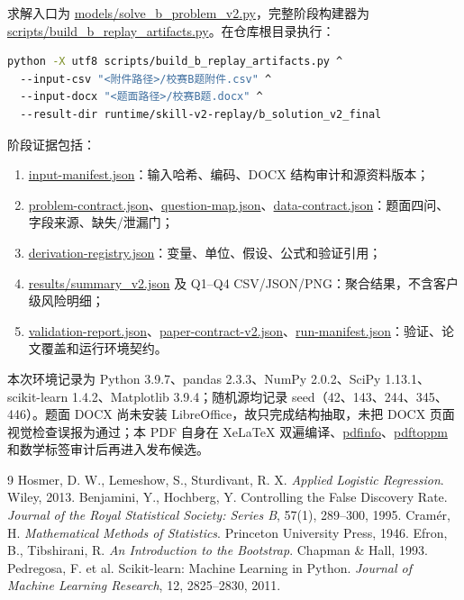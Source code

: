 \documentclass[UTF8,a4paper,11pt]{ctexart}
\newcommand{\code}[1]{\url{#1}}
\begin{document}
求解入口为 \code{models/solve_b_problem_v2.py}，完整阶段构建器为 \code{scripts/build_b_replay_artifacts.py}。在仓库根目录执行：
\begin{lstlisting}[language=bash,basicstyle=\ttfamily\small,frame=single,rulecolor=\color{jade},backgroundcolor=\color{papergray},breaklines=true]
python -X utf8 scripts/build_b_replay_artifacts.py ^
  --input-csv "<附件路径>/校赛B题附件.csv" ^
  --input-docx "<题面路径>/校赛B题.docx" ^
  --result-dir runtime/skill-v2-replay/b_solution_v2_final
\end{lstlisting}

阶段证据包括：
\begin{enumerate}[label=\arabic*.,leftmargin=2.5em]
  \item \code{input-manifest.json}：输入哈希、编码、DOCX 结构审计和源资料版本；
  \item \code{problem-contract.json}、\code{question-map.json}、\code{data-contract.json}：题面四问、字段来源、缺失/泄漏门；
  \item \code{derivation-registry.json}：变量、单位、假设、公式和验证引用；
  \item \code{results/summary_v2.json} 及 Q1--Q4 CSV/JSON/PNG：聚合结果，不含客户级风险明细；
  \item \code{validation-report.json}、\code{paper-contract-v2.json}、\code{run-manifest.json}：验证、论文覆盖和运行环境契约。
\end{enumerate}

本次环境记录为 Python 3.9.7、pandas 2.3.3、NumPy 2.0.2、SciPy 1.13.1、scikit-learn 1.4.2、Matplotlib 3.9.4；随机源均记录 seed（42、143、244、345、446）。题面 DOCX 尚未安装 LibreOffice，故只完成结构抽取，未把 DOCX 页面视觉检查误报为通过；本 PDF 自身在 XeLaTeX 双遍编译、\code{pdfinfo}、\code{pdftoppm} 和数学标签审计后再进入发布候选。

\begin{thebibliography}{9}
 Hosmer, D. W., Lemeshow, S., Sturdivant, R. X. \emph{Applied Logistic Regression}. Wiley, 2013.
 Benjamini, Y., Hochberg, Y. Controlling the False Discovery Rate. \emph{Journal of the Royal Statistical Society: Series B}, 57(1), 289--300, 1995.
 Cramér, H. \emph{Mathematical Methods of Statistics}. Princeton University Press, 1946.
 Efron, B., Tibshirani, R. \emph{An Introduction to the Bootstrap}. Chapman \& Hall, 1993.
 Pedregosa, F. et al. Scikit-learn: Machine Learning in Python. \emph{Journal of Machine Learning Research}, 12, 2825--2830, 2011.
\end{thebibliography}
\end{document}
